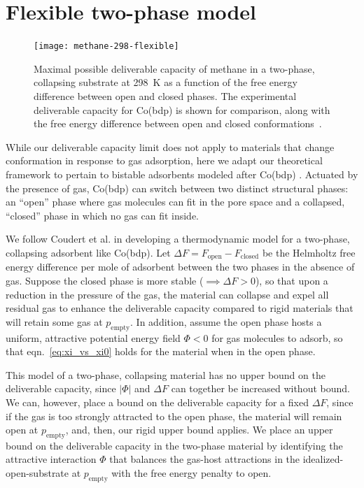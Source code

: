 \documentclass[pre,twocolumn]{revtex4-2}
\newcommand\V{\Phi}
\newcommand\pempty{\ensuremath{p_{\text{empty}}}}
\begin{document}
\section{Flexible two-phase model}
\begin{figure}
    \centering
    \texttt{[image: methane-298-flexible]}
    \caption{Maximal possible deliverable capacity of methane in a two-phase, collapsing substrate at 298\ K as a function of the free energy difference 
      between open and closed phases. The experimental deliverable capacity for Co(bdp) is shown for
       comparison, along with the free energy difference between open and closed conformations~\cite{mason2015methane}.}
    \label{fig:methane-flexible}
\end{figure}
While our deliverable capacity limit does not apply to materials that change
conformation in response to gas adsorption, here we adapt our theoretical
framework to pertain to bistable adsorbents modeled after Co(bdp)
\cite{mason2015methane}. Actuated by the presence of gas, Co(bdp) can switch
between two distinct structural phases: an ``open'' phase where gas molecules
can fit in the pore space and a collapsed, ``closed'' phase in which no gas can
fit inside.

We follow Coudert et al. \cite{coudert2008thermodynamics} in developing a
thermodynamic model for a two-phase, collapsing adsorbent like Co(bdp). 
Let $\Delta F=F_{\text{open}}-F_{\text{closed}}$ be the Helmholtz free energy difference per
mole of adsorbent between the two phases in the absence of gas. Suppose the
closed phase is more stable ($\implies \Delta F >0$), so that upon a reduction
in the pressure of the gas, the material can collapse and expel all residual
gas to enhance the deliverable capacity compared to rigid materials that will
retain some gas at $\pempty$. In addition, assume the open phase hosts a
uniform, attractive potential energy field $\V<0$ for gas molecules to adsorb,
so that eqn.~\ref{eq:xi_vs_xi0} holds for the material when in the open phase.

This model of a two-phase, collapsing material has no upper bound on the
deliverable capacity, since $|\V|$ and $\Delta F$ can together be increased
without bound.
We can, however, place a bound on the deliverable capacity for a fixed $\Delta F$, since if
the gas is too strongly attracted to the open phase, the material will remain
open at $\pempty$, and, then, our rigid upper bound applies.
We place an upper bound on the deliverable capacity in the two-phase material by identifying the
attractive interaction $\V$ that balances the gas-host attractions in the
idealized-open-substrate at $\pempty$ with the free energy penalty to open.
\end{document}
